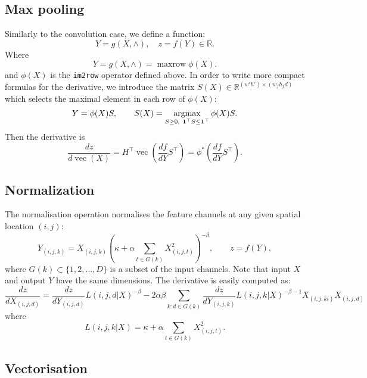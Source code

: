 \documentclass[12pt]{article}
\newcommand{\real}{\mathbb{R}}
\newcommand{\vv}{\operatorname{vec}}
\begin{document}
\subsection{Max pooling}\label{s:pooling}

Similarly to the convolution case, we define a function:
\[
 Y = g(X,\wedge), \quad z = f(Y) \in \real.
\]
Where
\[
\boxed{Y = g(X,\wedge) = \operatorname{maxrow}\phi(X).}
\]
and $\phi(X)$ is the {\tt im2row} operator defined above. In order to write more compact formulas for the derivative, we introduce the matrix $S(X) \in \real^{(w'h')
\times(w_fh_fd)}$ which selects the maximal element in each row of $\phi(X)$:
\[
  Y = \phi(X)S,
  \qquad
   S(X) = \operatornamewithlimits{argmax}_{S \geq 0,\ \mathbf{1}^\top S \leq \mathbf{1}^\top} \phi(X) S.
\]
Then the derivative is
\[
\boxed{
\frac{d z}{d \vv(X)}
=
H^\top
\vv\left(
\frac{d f}{d Y}S^\top
\right)
=
\phi^*\left(
\frac{d f}{d Y}S^\top
\right).
}
\]

\subsection{Normalization}\label{s:normalization}

The normalisation operation normalises the feature channels at any given spatial location $(i,j)$:
\[
 Y_{(i,j,k)} = X_{(i,j,k)} \left( \kappa + \alpha \sum_{t\in G(k)} X_{(i,j,t)}^2 \right)^{-\beta},
 \qquad
 z = f(Y),
\]
where $G(k) \subset \{1, 2, \dots, D\}$ is a subset of the input channels. Note that input $X$ and output $Y$ have the same dimensions. The derivative is easily computed as:
\[
\frac{dz}{d X_{(i,j,d)}}
=
\frac{dz}{d Y_{(i,j,d)}}
L(i,j,d|X)^{-\beta}
-2\alpha\beta
\sum_{k:d\in G(k)}
\frac{dz}{d Y_{(i,j,k)}}
L(i,j,k|X)^{-\beta-1} X_{(i,j,ki)} X_{(i,j,d)}
\]
where
\[
 L(i,j,k|X) = \kappa + \alpha \sum_{t\in G(k)} X_{(i,j,t)}^2.
\]

\subsection{Vectorisation}\label{s:vectorisation}
\end{document}
